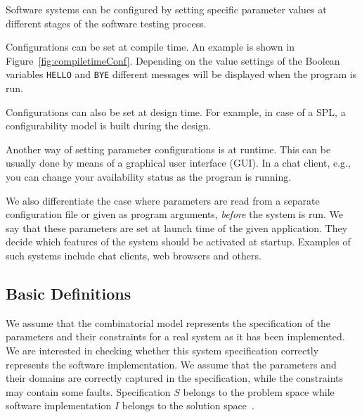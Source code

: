 \begin{tikzborder}{\cite{Gargantini16:validation}}
	Software systems can be configured by setting specific parameter values at different stages of the software testing process.
	
	Configurations can be set at compile time. An example is shown in Figure~\ref{fig:compiletimeConf}. Depending on the value settings of the Boolean variables \texttt{HELLO} and \texttt{BYE} different messages will be displayed when the program is run.
	
	Configurations can also be set at design time. For example, in case of a SPL, a configurability model is built during the design. 
	
	Another way of setting parameter configurations is at runtime. This can be usually done by means of a graphical user interface (GUI). In a chat client, e.g., you can change your availability status as the program is running. 
	
	We also differentiate the case where parameters are read from a separate configuration file or given as program arguments, \emph{before} the system is run. We say that these parameters are set at launch time of the given application. They decide which features of the system should be activated at startup. Examples of such systems include chat clients, web browsers and others. 
	\be
	
	\subsection{Basic Definitions}
	
	\bb We assume that the combinatorial model represents the specification
	of the parameters and their constraints for a real system as it has
	been implemented. We are interested in checking whether this system specification 
	correctly represents the software implementation. We assume that the parameters and their domains are correctly captured in the specification, while the constraints may contain some faults. Specification $S$ belongs to the problem space while software implementation $I$ belongs to the solution space~\cite{NadiBKC14}. 
	

\end{tikzborder}

